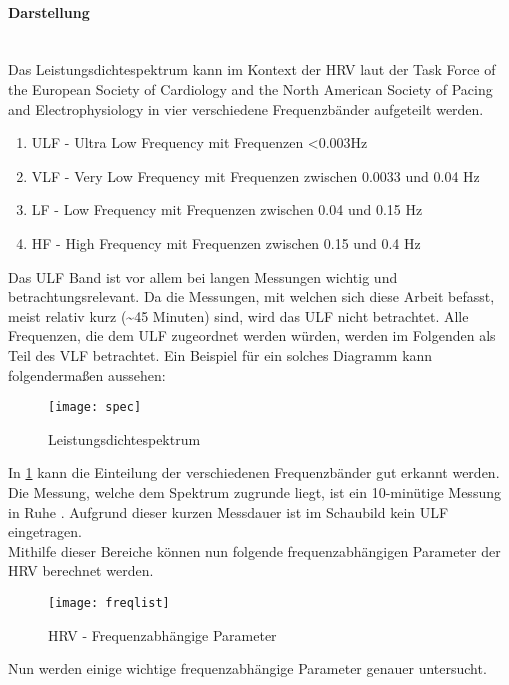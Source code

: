 \paragraph{Darstellung}\mbox{} \\
Das Leistungsdichtespektrum kann im Kontext der \acs{HRV} laut der Task Force of the European Society of Cardiology and the North American Society of Pacing and Electrophysiology \cite{deffreq} in vier verschiedene Frequenzbänder aufgeteilt werden.\cite[S.5]{med}

\begin{enumerate}
	\item \acs{ULF} - Ultra Low Frequency mit Frequenzen <0.003Hz
	\item \acs{VLF} - Very Low Frequency mit Frequenzen zwischen 0.0033 und 0.04 Hz
	\item \acs{LF} - Low Frequency mit Frequenzen zwischen 0.04 und 0.15 Hz
	\item \acs{HF} - High Frequency mit Frequenzen zwischen 0.15 und 0.4 Hz
\end{enumerate}

Das ULF Band ist vor allem bei langen Messungen wichtig und betrachtungsrelevant. Da die Messungen, mit welchen sich diese Arbeit befasst, meist relativ kurz (\textasciitilde 45 Minuten) sind, wird das ULF nicht betrachtet. Alle Frequenzen, die dem ULF zugeordnet werden würden, werden im Folgenden als Teil des \acs{VLF} betrachtet. Ein Beispiel für ein solches Diagramm kann folgendermaßen aussehen:

\begin{figure}[H]
	\centering
	\texttt{[image: spec]}
	\caption{Leistungsdichtespektrum}
	\label{fig:spec}
	\cite{freque}
\end{figure}


In \ref{fig:spec} kann die Einteilung der verschiedenen Frequenzbänder gut erkannt werden. Die Messung, welche dem Spektrum zugrunde liegt, ist ein 10-minütige Messung in Ruhe \cite{freque}. Aufgrund dieser kurzen Messdauer ist im Schaubild kein \acs{ULF} eingetragen. \\

Mithilfe dieser Bereiche können nun folgende frequenzabhängigen Parameter der \acs{HRV} berechnet werden. 
\begin{figure}[H]
	\centering
	\texttt{[image: freqlist]}
	\caption{HRV - Frequenzabhängige Parameter}
	\label{fig:freqpic}
	\cite[S.2]{med}
\end{figure}
Nun werden einige wichtige frequenzabhängige Parameter genauer untersucht.

